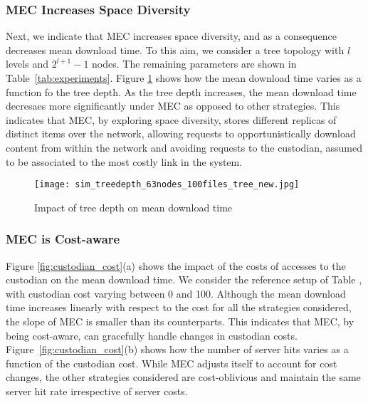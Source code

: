 \subsubsection{MEC Increases Space Diversity}
\label{sub:space_diversity}


Next, we indicate that MEC increases space diversity, and as a consequence decreases mean download time.  
 To this aim, we consider a tree topology with $l$ levels and $2^{l+1}-1$ nodes.   The remaining  parameters are shown in Table~\ref{tab:experiments}.
Figure \ref{fig:treedepth} shows how the mean download time varies as a function fo the tree depth.   As the tree depth increases,  the mean download time decresaes more significantly under MEC as opposed to other strategies.  This indicates that MEC, by  exploring space diversity, stores different replicas of distinct items over the network, allowing requests to opportunistically download content from within the network and avoiding requests to the custodian, assumed to be associated to the most costly link in the system.

\begin{figure}[h]
\begin{center}
	\texttt{[image: sim\_treedepth\_63nodes\_100files\_tree\_new.jpg]}
\end{center}
\vspace{-0.2in}
\caption{Impact of tree depth on mean download time  }
\label{fig:treedepth}
\end{figure}


\subsubsection{MEC is Cost-aware}
\label{sub:cost_aware}




Figure \ref{fig:custodian_cost}(a) shows the impact of the costs of accesses to the  
custodian on the mean download time. We consider the reference setup of Table \label{tab:experiments}, with custodian cost varying between 0 and 100.  
Although the mean download time increases linearly with respect to the cost for all the strategies considered, the slope of  MEC is smaller than its counterparts.  This indicates that MEC, by being cost-aware, can gracefully handle changes in  custodian costs.  Figure~\ref{fig:custodian_cost}(b) shows how the number of server hits varies as a function of the custodian cost.  While MEC adjusts itself to account for cost changes, the other strategies considered are cost-oblivious and maintain the same server hit rate irrespective of server costs.

